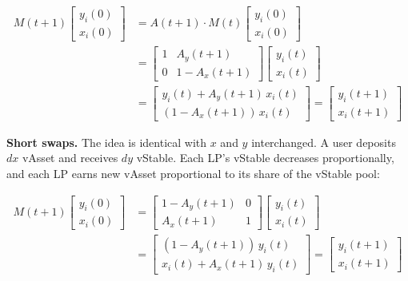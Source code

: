 \documentclass{article}
\begin{document}
\begin{align*}
M(t+1)\begin{bmatrix}y_i(0)\\x_i(0)\end{bmatrix}
&= A(t+1)\cdot M(t)\begin{bmatrix}y_i(0)\\x_i(0)\end{bmatrix} \\
&= \begin{bmatrix}1 & A_y(t+1)\\0 & 1-A_x(t+1)\end{bmatrix}
   \begin{bmatrix}y_i(t)\\x_i(t)\end{bmatrix} \\
&= \begin{bmatrix}y_i(t) + A_y(t+1)\,x_i(t)\\ (1-A_x(t+1))\,x_i(t)\end{bmatrix}
= \begin{bmatrix}y_i(t+1)\\x_i(t+1)\end{bmatrix}
\end{align*}

\medskip
\noindent\textbf{Short swaps.} The idea is identical with $x$ and $y$ interchanged. A user
deposits $dx$ vAsset and receives $dy$ vStable. Each LP's vStable decreases proportionally,
and each LP earns new vAsset proportional to its share of the vStable pool:

\begin{align*}
M(t+1)\begin{bmatrix}y_i(0)\\x_i(0)\end{bmatrix}
&= \begin{bmatrix}1-A_y(t+1) & 0\\A_x(t+1) & 1\end{bmatrix}
   \begin{bmatrix}y_i(t)\\x_i(t)\end{bmatrix} \\
&= \begin{bmatrix}(1-A_y(t+1))\,y_i(t)\\ x_i(t)+A_x(t+1)\,y_i(t)\end{bmatrix}
= \begin{bmatrix}y_i(t+1)\\x_i(t+1)\end{bmatrix}
\end{align*}
\end{document}
